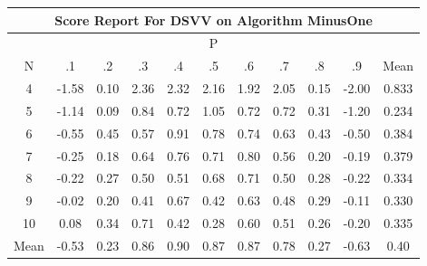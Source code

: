 \documentclass[11pt,a4paper]{report}
\begin{document}
\begin{longtable}{ | c || c | c | c | c | c | c | c | c | c || c |}
\hline
\multicolumn{11}{|c|}{ Score Report For DSVV on Algorithm MinusOne} \\
\hline
\multicolumn{11}{|c|}{ P } \\
\hline
N & .1 & .2 & .3 & .4 & .5 & .6 & .7 & .8 & .9 & Mean\\
 \hline
 \hline
 \endhead
  4 &  \cellcolor[HTML]{FFD7D7} -1.58 &  \cellcolor[HTML]{FFFFFF} 0.10 &  \cellcolor[HTML]{C7C7FF} 2.36 &  \cellcolor[HTML]{C7C7FF} 2.32 &  \cellcolor[HTML]{C7C7FF} 2.16 &  \cellcolor[HTML]{CFCFFF} 1.92 &  \cellcolor[HTML]{CFCFFF} 2.05 &  \cellcolor[HTML]{FFFFFF} 0.15 &  \cellcolor[HTML]{FFCFCF} -2.00 & 0.833 \\
  5 &  \cellcolor[HTML]{FFDFDF} -1.14 &  \cellcolor[HTML]{FFFFFF} 0.09 &  \cellcolor[HTML]{E7E7FF} 0.84 &  \cellcolor[HTML]{EFEFFF} 0.72 &  \cellcolor[HTML]{E7E7FF} 1.05 &  \cellcolor[HTML]{EFEFFF} 0.72 &  \cellcolor[HTML]{EFEFFF} 0.72 &  \cellcolor[HTML]{F7F7FF} 0.31 &  \cellcolor[HTML]{FFDFDF} -1.20 & 0.234 \\
  6 &  \cellcolor[HTML]{FFEFEF} -0.55 &  \cellcolor[HTML]{F7F7FF} 0.45 &  \cellcolor[HTML]{EFEFFF} 0.57 &  \cellcolor[HTML]{E7E7FF} 0.91 &  \cellcolor[HTML]{EFEFFF} 0.78 &  \cellcolor[HTML]{EFEFFF} 0.74 &  \cellcolor[HTML]{EFEFFF} 0.63 &  \cellcolor[HTML]{F7F7FF} 0.43 &  \cellcolor[HTML]{FFEFEF} -0.50 & 0.384 \\
  7 &  \cellcolor[HTML]{FFF7F7} -0.25 &  \cellcolor[HTML]{F7F7FF} 0.18 &  \cellcolor[HTML]{EFEFFF} 0.64 &  \cellcolor[HTML]{EFEFFF} 0.76 &  \cellcolor[HTML]{EFEFFF} 0.71 &  \cellcolor[HTML]{E7E7FF} 0.80 &  \cellcolor[HTML]{EFEFFF} 0.56 &  \cellcolor[HTML]{F7F7FF} 0.20 &  \cellcolor[HTML]{FFF7F7} -0.19 & 0.379 \\
  8 &  \cellcolor[HTML]{FFF7F7} -0.22 &  \cellcolor[HTML]{F7F7FF} 0.27 &  \cellcolor[HTML]{EFEFFF} 0.50 &  \cellcolor[HTML]{EFEFFF} 0.51 &  \cellcolor[HTML]{EFEFFF} 0.68 &  \cellcolor[HTML]{EFEFFF} 0.71 &  \cellcolor[HTML]{EFEFFF} 0.50 &  \cellcolor[HTML]{F7F7FF} 0.28 &  \cellcolor[HTML]{FFF7F7} -0.22 & 0.334 \\
  9 &  \cellcolor[HTML]{FFFFFF} -0.02 &  \cellcolor[HTML]{F7F7FF} 0.20 &  \cellcolor[HTML]{F7F7FF} 0.41 &  \cellcolor[HTML]{EFEFFF} 0.67 &  \cellcolor[HTML]{F7F7FF} 0.42 &  \cellcolor[HTML]{EFEFFF} 0.63 &  \cellcolor[HTML]{EFEFFF} 0.48 &  \cellcolor[HTML]{F7F7FF} 0.29 &  \cellcolor[HTML]{FFFFFF} -0.11 & 0.330 \\
  10 &  \cellcolor[HTML]{FFFFFF} 0.08 &  \cellcolor[HTML]{F7F7FF} 0.34 &  \cellcolor[HTML]{EFEFFF} 0.71 &  \cellcolor[HTML]{F7F7FF} 0.42 &  \cellcolor[HTML]{F7F7FF} 0.28 &  \cellcolor[HTML]{EFEFFF} 0.60 &  \cellcolor[HTML]{EFEFFF} 0.51 &  \cellcolor[HTML]{F7F7FF} 0.26 &  \cellcolor[HTML]{FFF7F7} -0.20 & 0.335 \\
 \hline
 \hline
Mean &  \cellcolor[HTML]{FFEFEF} -0.53 &  \cellcolor[HTML]{F7F7FF} 0.23 &  \cellcolor[HTML]{E7E7FF} 0.86 &  \cellcolor[HTML]{E7E7FF} 0.90 &  \cellcolor[HTML]{E7E7FF} 0.87 &  \cellcolor[HTML]{E7E7FF} 0.87 &  \cellcolor[HTML]{EFEFFF} 0.78 &  \cellcolor[HTML]{F7F7FF} 0.27 &  \cellcolor[HTML]{FFEFEF} -0.63 &  \cellcolor[HTML]{F7F7FF} 0.40
\end{longtable}
\end{document}
